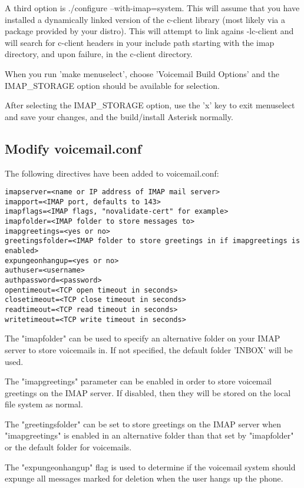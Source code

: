 A third option is ./configure --with-imap=system. This will assume
that you have installed a dynamically linked version of the c-client
library (most likely via a package provided by your distro). This will
attempt to link agains -lc-client and will search for c-client headers
in your include path starting with the imap directory, and upon failure,
in the c-client directory.

When you run 'make menuselect', choose 'Voicemail Build Options' and the
IMAP\_STORAGE option should be available for selection.

After selecting the IMAP\_STORAGE option, use the 'x' key to exit
menuselect and save your changes, and the build/install Asterisk
normally.

\subsection{Modify voicemail.conf}

The following directives have been added to voicemail.conf:
\begin{astlisting}
\begin{verbatim}
imapserver=<name or IP address of IMAP mail server>
imapport=<IMAP port, defaults to 143>
imapflags=<IMAP flags, "novalidate-cert" for example>
imapfolder=<IMAP folder to store messages to>
imapgreetings=<yes or no>
greetingsfolder=<IMAP folder to store greetings in if imapgreetings is enabled>
expungeonhangup=<yes or no>
authuser=<username>
authpassword=<password>
opentimeout=<TCP open timeout in seconds>
closetimeout=<TCP close timeout in seconds>
readtimeout=<TCP read timeout in seconds>
writetimeout=<TCP write timeout in seconds>
\end{verbatim}
\end{astlisting}

The "imapfolder" can be used to specify an alternative folder on your IMAP server
to store voicemails in. If not specified, the default folder 'INBOX' will be used.

The "imapgreetings" parameter can be enabled in order to store voicemail greetings
on the IMAP server. If disabled, then they will be stored on the local file system
as normal.

The "greetingsfolder" can be set to store greetings on the IMAP server when
"imapgreetings" is enabled in an alternative folder than that set by "imapfolder"
or the default folder for voicemails.

The "expungeonhangup" flag is used to determine if the voicemail system should
expunge all messages marked for deletion when the user hangs up the phone.

